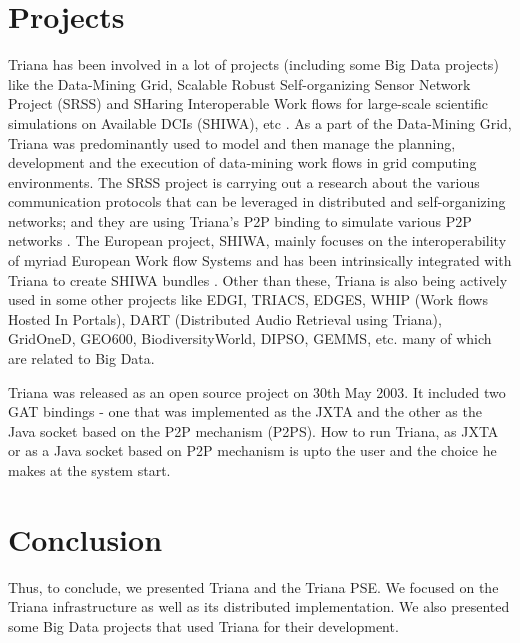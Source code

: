 \documentclass[9pt,twocolumn,twoside]{../../styles/osajnl}
\begin{document}
\section{Projects}

Triana has been involved in a lot of projects (including some Big Data projects) 
like the Data-Mining Grid, 
Scalable Robust Self-organizing Sensor Network Project (SRSS) and 
SHaring Interoperable Work flows for large-scale
scientific simulations on Available DCIs (SHIWA), etc \cite{Triana-projects} 
\cite{Triana-Data-Mining-Grid} \cite{Triana-SRSS} \cite{Triana-SHIWA} .  As a part of
the Data-Mining Grid, Triana was predominantly used to model and then
manage the planning, development and the execution of data-mining work
flows in grid computing environments.  The SRSS
project is carrying out a research about the various communication
protocols that can be leveraged in distributed and self-organizing
networks; and they are using Triana's P2P binding to simulate various
P2P networks \cite{Triana-SRSS}.  The European project, SHIWA, mainly focuses on the
interoperability of myriad European Work flow Systems and has been
intrinsically integrated with Triana to create SHIWA bundles \cite{Triana-SHIWA}.  
Other than these, Triana is also being actively used
in some other projects like EDGI, TRIACS, EDGES, WHIP (Work flows
Hosted In Portals), DART (Distributed Audio Retrieval using Triana),
GridOneD, GEO600, BiodiversityWorld, DIPSO, GEMMS, etc. many of which
are related to Big Data.

Triana was released as an open source project on 30th May 2003. It 
included two GAT bindings - one that was implemented as the JXTA and the 
other as the Java socket based on the P2P mechanism (P2PS). How to run 
Triana, as JXTA or as a Java socket based on P2P mechanism is upto the 
user and the choice he makes at the system start.

\section{Conclusion}

Thus, to conclude, we presented Triana and the Triana PSE.  We focused
on the Triana infrastructure as well as its distributed
implementation.  We also presented some Big Data projects that used
Triana for their development.



\end{document}
